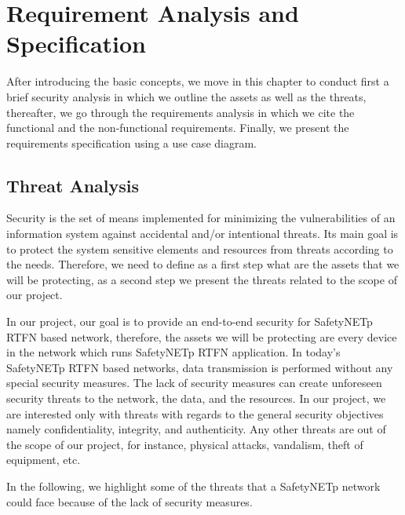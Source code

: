 %
%
%
%
%

\chapter{Requirement Analysis and Specification}

After introducing the basic concepts, we move in this chapter to conduct first a brief security
analysis in which we outline the assets as well as the threats, thereafter, we go through the requirements
analysis in which we cite the functional and the non-functional requirements.
Finally, we present the requirements specification using a use case diagram.

\section{Threat Analysis}

Security is the set of means implemented for minimizing the vulnerabilities of an information
system against accidental and/or intentional threats. Its main goal is to protect the system sensitive elements and
resources from threats according to the needs. Therefore, we need to define as a first step what
are the assets that we will be protecting, as a second step we present the threats related to the scope of our project.

In our project, our goal is to provide an end-to-end security for SafetyNETp RTFN based network, therefore,
the assets we will be protecting are every device in the network which runs SafetyNETp RTFN application.
In today’s SafetyNETp RTFN based networks, data transmission is
performed without any special security measures. The lack of security measures can create unforeseen security threats to the network,
the data, and the resources. In our project, we are interested only with threats with regards to the general security objectives
namely confidentiality, integrity, and authenticity. Any other threats are out of the scope of our project, for instance,
physical attacks, vandalism, theft of equipment, etc.

In the following, we highlight some of the threats that a SafetyNETp network could face because of the lack of
security measures.


